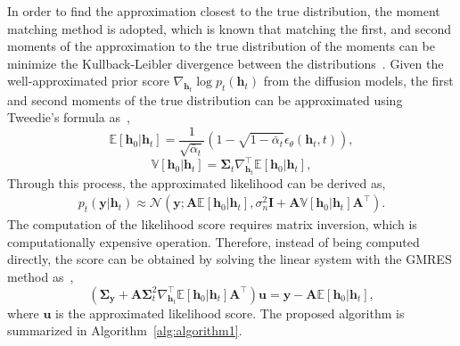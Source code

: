 \documentclass[lettersize,journal]{IEEEtran}
\begin{document}
In order to find the approximation closest to the true distribution, the moment matching method is adopted, which is known that matching the first, and second moments of the approximation to the true distribution of the moments can be minimize the Kullback-Leibler divergence between the distributions~\cite{bishopPatternRecognitionMachine2006}.
Given the well-approximated prior score $\nabla_{\mathbf{h}_{t}}\log p_{t}(\mathbf{h}_{t})$ from the diffusion models, the first and second moments of the true distribution can be approximated using Tweedie’s formula as~\cite{efronTweediesFormulaSelection2011},
\begin{equation}
\mathbb{E}[\mathbf{h}_{0}|\mathbf{h}_{t}] = \frac{1}{\sqrt{ \bar{\alpha}_{t} }}(1-\sqrt{ 1-\bar{\alpha}_{t} }\epsilon_{\theta}(\mathbf{h}_{t},t)),
\end{equation}
\begin{equation}
\mathbb{V}[\mathbf{h}_{0}|\mathbf{h}_{t}] = \boldsymbol{\Sigma}_{t}\nabla_{\mathbf{h}_{t}}^{\top}\mathbb{E}[\mathbf{h}_{0}|\mathbf{h}_{t}],
\end{equation}
Through this process, the approximated likelihood can be derived as,
\begin{equation}
\begin{aligned}
p_{t}(\mathbf{y}|\mathbf{h}_{t}) \approx \mathcal{N}(\mathbf{y}; \mathbf{A}\mathbb{E}[\mathbf{h}_{0}|\mathbf{h}_{t}], \sigma_{n}^{2}\mathbf{I}+\mathbf{A}\mathbb{V}[\mathbf{h}_{0}|\mathbf{h}_{t}]\mathbf{A}^{\top}).
\end{aligned}
\end{equation}
The computation of the likelihood score requires matrix inversion, which is computationally expensive operation. Therefore, instead of being computed directly, the score can be obtained by solving the linear system with the GMRES method as~\cite{saadGMRESGeneralizedMinimal1986},
\begin{equation}
(\boldsymbol{\Sigma}_{\mathbf{y}}+\mathbf{A}\boldsymbol{\Sigma}_{t}^{2}\nabla_{\mathbf{h}_{t}}^{\top}\mathbb{E}[\mathbf{h}_{0}|\mathbf{h}_{t}]\mathbf{A}^{\top})\mathbf{u} = \mathbf{y}- \mathbf{A}\mathbb{E}[\mathbf{h}_{0}|\mathbf{h}_{t}],
\end{equation}
where $\mathbf{u}$ is the approximated likelihood score. The proposed algorithm is summarized in Algorithm~\ref{alg:algorithm1}.
\end{document}
